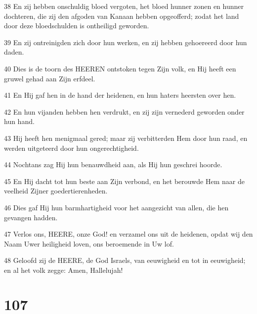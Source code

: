 \par 38 En zij hebben onschuldig bloed vergoten, het bloed hunner zonen en hunner dochteren, die zij den afgoden van Kanaan hebben opgeofferd; zodat het land door deze bloedschulden is ontheiligd geworden.
\par 39 En zij ontreinigden zich door hun werken, en zij hebben gehoereerd door hun daden.
\par 40 Dies is de toorn des HEEREN ontstoken tegen Zijn volk, en Hij heeft een gruwel gehad aan Zijn erfdeel.
\par 41 En Hij gaf hen in de hand der heidenen, en hun haters heersten over hen.
\par 42 En hun vijanden hebben hen verdrukt, en zij zijn vernederd geworden onder hun hand.
\par 43 Hij heeft hen menigmaal gered; maar zij verbitterden Hem door hun raad, en werden uitgeteerd door hun ongerechtigheid.
\par 44 Nochtans zag Hij hun benauwdheid aan, als Hij hun geschrei hoorde.
\par 45 En Hij dacht tot hun beste aan Zijn verbond, en het berouwde Hem naar de veelheid Zijner goedertierenheden.
\par 46 Dies gaf Hij hun barmhartigheid voor het aangezicht van allen, die hen gevangen hadden.
\par 47 Verlos ons, HEERE, onze God! en verzamel ons uit de heidenen, opdat wij den Naam Uwer heiligheid loven, ons beroemende in Uw lof.
\par 48 Geloofd zij de HEERE, de God Israels, van eeuwigheid en tot in eeuwigheid; en al het volk zegge: Amen, Hallelujah!

\chapter{107}

